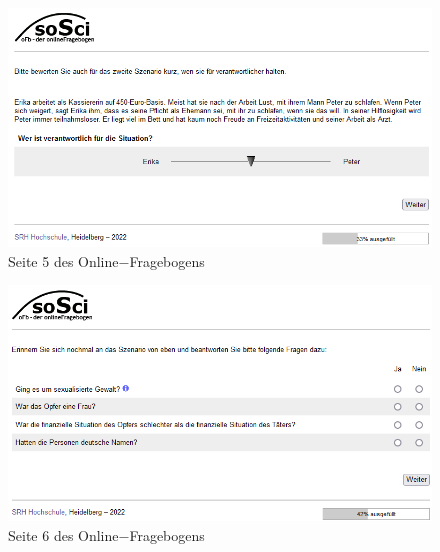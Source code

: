 \begin{appendices}
    \newpage
    \begin{figure}[htb!]
        \centering
            \includegraphics[width=\textwidth]{Seite 5.png}
            \caption[]{Seite 5 des Online$-$Fragebogens}
    \end{figure}
    
    \begin{figure}[htb!]
        \centering
            \includegraphics[width=\textwidth]{Seite 6.png}
            \caption[]{Seite 6 des Online$-$Fragebogens}
    \end{figure}
    

\end{appendices}
